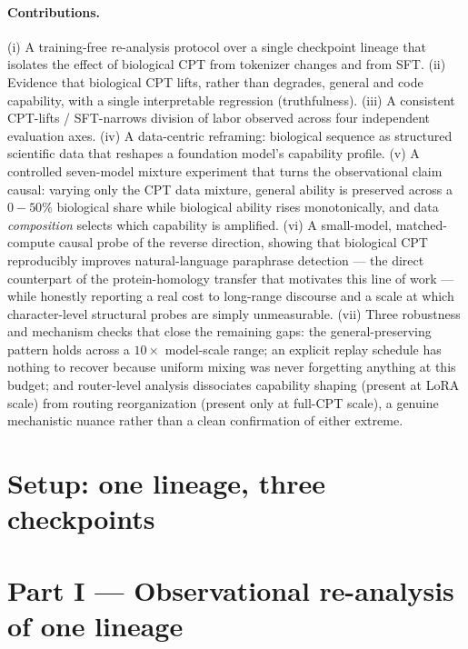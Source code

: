 \documentclass[11pt]{article}
\begin{document}
\paragraph{Contributions.}
(i) A training-free re-analysis protocol over a single checkpoint lineage that isolates the
effect of biological CPT from tokenizer changes and from SFT. (ii) Evidence that biological CPT
lifts, rather than degrades, general and code capability, with a single interpretable regression
(truthfulness). (iii) A consistent CPT-lifts / SFT-narrows division of labor observed across four
independent evaluation axes. (iv) A data-centric reframing: biological sequence as structured
scientific data that reshapes a foundation model's capability profile. (v) A controlled
seven-model mixture experiment that turns the observational claim causal: varying only the CPT
data mixture, general ability is preserved across a $0\!-\!50\%$ biological share while biological
ability rises monotonically, and data \emph{composition} selects which capability is amplified.
(vi) A small-model, matched-compute causal probe of the reverse direction, showing that
biological CPT reproducibly improves natural-language paraphrase detection --- the direct
counterpart of the protein-homology transfer that motivates this line of work --- while honestly
reporting a real cost to long-range discourse and a scale at which character-level structural
probes are simply unmeasurable. (vii) Three robustness and mechanism checks that close the
remaining gaps: the general-preserving pattern holds across a $10\times$ model-scale range;
an explicit replay schedule has nothing to recover because uniform mixing was never forgetting
anything at this budget; and router-level analysis dissociates capability shaping (present at
LoRA scale) from routing reorganization (present only at full-CPT scale), a genuine mechanistic
nuance rather than a clean confirmation of either extreme.

\section{Setup: one lineage, three checkpoints}
\label{sec:setup}


\section{Part I --- Observational re-analysis of one lineage}
\label{sec:results}

\end{document}
